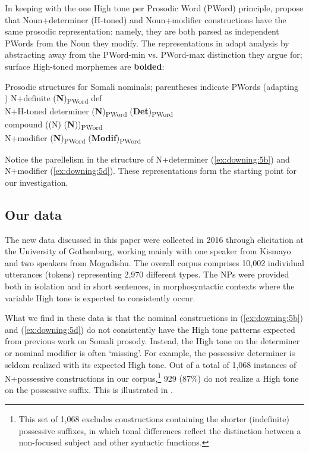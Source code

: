 \documentclass[output=paper]{langscibook}
\begin{document}
In keeping with the one High tone per Prosodic Word (PWord) principle, \citet{Green2016} propose that Noun+determiner (H-toned) and Noun+modifier constructions have the same prosodic representation: namely, they are both parsed as independent PWords from the Noun they modify. The representations in  adapt  analysis by abstracting away from the PWord-min vs. PWord-max distinction they argue for; surface High-toned morphemes are \textbf{bolded}:


\ea  Prosodic structures for Somali nominals; parentheses indicate PWords (adapting \citealt{Green2016})  \label{ex:downing:5}
\ea  N+definite  (\textbf{N})\textsubscript{PWord} def\label{ex:downing:5a}\\
\ex  N+H-toned determiner  (\textbf{N})\textsubscript{PWord} (\textbf{Det})\textsubscript{PWord}\label{ex:downing:5b}\\
\ex  compound  ((N) (\textbf{N}))\textsubscript{PWord}\label{ex:downing:5c}\\
\ex  N+modifier  (\textbf{N})\textsubscript{PWord} (\textbf{Modif})\textsubscript{PWord}\label{ex:downing:5d}\\
\z
\z

Notice the parellelism in the structure of N+determiner (\ref{ex:downing:5b}) and N+modifier (\ref{ex:downing:5d}). These representations form the starting point for our investigation.


\subsection{Our data}

The new data discussed in this paper were collected in 2016 through elicitation at the University of Gothenburg, working mainly with one speaker from Kismayo and two speakers from Mogadishu. The overall corpus comprises 10,002 individual utterances (tokens) representing 2,970 different types. The NPs were provided both in isolation and in short sentences, in morphosyntactic contexts where the variable High tone is expected to consistently occur.

What we find in these data is that the nominal constructions in (\ref{ex:downing:5b}) and (\ref{ex:downing:5d}) do not consistently have the High tone patterns expected from previous work on Somali prosody. Instead, the High tone on the determiner or nominal modifier is often ‘missing’. For example, the possessive determiner is seldom realized with its expected High tone. Out of a total of 1,068 instances of N+possessive constructions in our corpus,\footnote{This set of 1,068 excludes constructions containing the shorter (indefinite) possessive suffixes, in which tonal differences reflect the distinction between a non-focused subject and other syntactic functions.} 929 (87\%) do not realize a High tone on the possessive suffix. This is illustrated in . 
\end{document}
